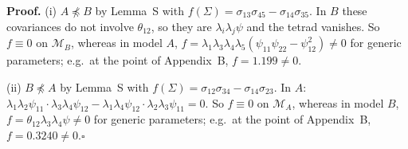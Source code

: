 \documentclass[10pt,a4paper]{article}
\newcommand{\nnest}{\not\preceq}
\begin{document}
\noindent\textbf{Proof.} (i) $A\nnest B$ by Lemma~S with $f(\Sigma)=\sigma_{13}\sigma_{45} - \sigma_{14}\sigma_{35}$. In $B$ these covariances do not involve $\theta_{12}$, so they are $\lambda_i\lambda_j\psi$ and the tetrad vanishes. So $f\equiv0$ on $\mathcal M_B$, whereas in model $A$, $f=\lambda_1\lambda_3\lambda_4\lambda_5(\psi_{11}\psi_{22}-\psi_{12}^2)\neq0$ for generic parameters; e.g.\ at the point of Appendix~B, $f=1.199\neq0$.\par\smallskip
\noindent(ii) $B\nnest A$ by Lemma~S with $f(\Sigma)=\sigma_{12}\sigma_{34} - \sigma_{14}\sigma_{23}$. In $A$: $\lambda_1\lambda_2\psi_{11}\cdot\lambda_3\lambda_4\psi_{12}-\lambda_1\lambda_4\psi_{12}\cdot\lambda_2\lambda_3\psi_{11}=0$. So $f\equiv0$ on $\mathcal M_A$, whereas in model $B$, $f=\theta_{12}\lambda_3\lambda_4\psi\neq0$ for generic parameters; e.g.\ at the point of Appendix~B, $f=0.3240\neq0$.\hfill$\square$\par\medskip
{}

\clearpage
\end{document}
